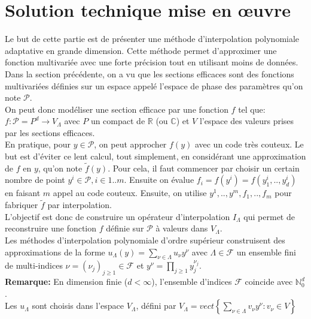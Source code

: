 \newpage
\section{Solution technique mise en œuvre}\label{sec:4}
\hspace{0.5cm}
Le but de cette partie est de présenter une méthode d'interpolation polynomiale adaptative en grande dimension.
Cette méthode permet d'approximer une fonction multivariée avec une forte précision tout en
utilisant moins de données. \\

Dans la section précédente, on a vu que les sections efficaces sont des fonctions multivariées
définies sur un espace appelé l'espace de phase des paramètres qu'on note $\mathcal{P}$. \\
On peut donc modéliser une section efficace par une fonction $f$ tel que: \\
$f:\mathcal{P} = P^d \rightarrow V_{\Lambda}$ avec $P$ un compact de $\mathbb{R}$ (ou $\mathbb{C}$) et
$V$ l'espace des valeurs prises par les sections efficaces. \\

En pratique, pour $y \in \mathcal{P}$, on peut approcher $f(y)$ avec un code très couteux. Le but est d'éviter ce lent
calcul, tout simplement, en considérant une approximation de $f$ en $y$, qu'on note $\tilde{f}(y)$.
Pour cela, il faut commencer par choisir un certain nombre de point $y^i \in \mathcal{P}, i \in 1..m$. Ensuite on
évalue $f_i = f(y^i) = f(y_1^i, .. , y_d^i)$ en faisant $m$ appel au code couteux. Ensuite, on utilise
$y^1,..,y^m,f_1,..,f_m$ pour fabriquer $\tilde{f}$ par interpolation.\\

L'objectif est donc de construire un opérateur d'interpolation $I_{\Lambda}$ qui permet de reconstruire une
fonction $f$ définie sur $\mathcal{P}$ à valeurs dans $V_{\Lambda}$. \\
Les méthodes d'interpolation polynomiale d'ordre supérieur construisent des approximations de la forme
$u_{\Lambda}(y) = \sum_{\nu \in \Lambda} u_{\nu} y^{\nu}$ avec $\Lambda \in \mathcal{F}$ un ensemble fini de multi-indices
$\nu = (\nu_j)_{j \geq 1} \in \mathcal{F}$ et $y^{\nu} = \prod_{j \geq 1} y_j ^ {\nu_j}$. \\

\textbf{Remarque:}
En dimension finie ($d < \infty$), l'ensemble d'indices $\mathcal{F}$ coincide avec $\mathbb{N}_0^d$.\\
Les $u_{\Lambda}$ sont choisis dans l'espace $V_{\Lambda}$, défini par $V_{\Lambda} = vect \left \{ \sum_{\nu \in \Lambda} v_{\nu} y^{\nu} : v_{\nu} \in V \right \}$

